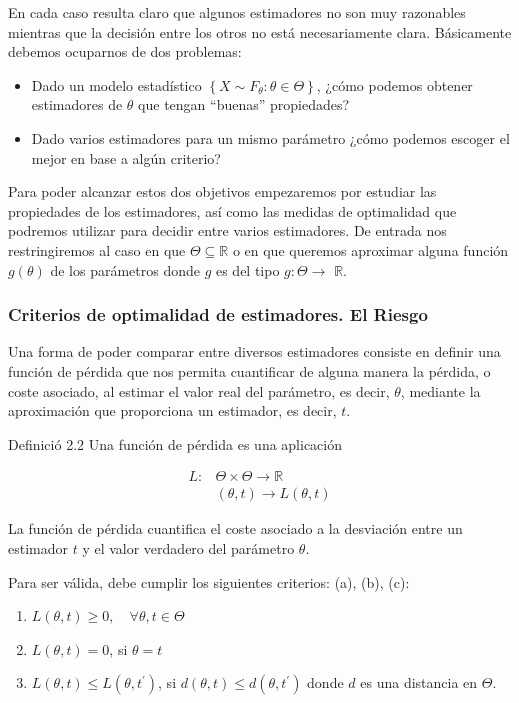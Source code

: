 \documentclass[
]{article}
\providecommand{\tightlist}{%
  \setlength{\itemsep}{0pt}\setlength{\parskip}{0pt}}
\begin{document}
En cada caso resulta claro que algunos estimadores no son muy razonables mientras que la decisión entre los otros no está necesariamente clara. Básicamente debemos ocuparnos de dos problemas:

\begin{itemize}
\tightlist
\item
  Dado un modelo estadístico \(\left\{X \sim F_{\theta}: \theta \in \Theta\right\}\), ¿cómo podemos obtener estimadores de \(\theta\) que tengan ``buenas'' propiedades?
\item
  Dado varios estimadores para un mismo parámetro ¿cómo podemos escoger el mejor en base a algún criterio?
\end{itemize}

Para poder alcanzar estos dos objetivos empezaremos por estudiar las propiedades de los estimadores, así como las medidas de optimalidad que podremos utilizar para decidir entre varios estimadores.
De entrada nos restringiremos al caso en que \(\Theta \subseteq \mathbb{R}\) o en que queremos aproximar alguna función \(g(\theta)\) de los parámetros donde \(g\) es del tipo \(g: \Theta \rightarrow\) \(\mathbb{R}\).

\subsubsection{Criterios de optimalidad de estimadores. El Riesgo}\label{criterios-de-optimalidad-de-estimadores.-el-riesgo}

Una forma de poder comparar entre diversos estimadores consiste en definir una función de pérdida que nos permita cuantificar de alguna manera la pérdida, o coste asociado, al estimar el valor real del parámetro, es decir, \(\theta\), mediante la aproximación que proporciona un estimador, es decir, \(t\).

Definició 2.2 Una función de pérdida es una aplicación

\[
\begin{aligned}
L: & \Theta \times \Theta \rightarrow \mathbb{R} \\
& (\theta, t) \rightarrow L(\theta, t)
\end{aligned}
\]

La función de pérdida cuantifica el coste asociado a la desviación entre un estimador \(t\) y el valor verdadero del parámetro \(\theta\).

Para ser válida, debe cumplir los siguientes criterios: (a), (b), (c):

\begin{enumerate}
\def\labelenumi{\alph{enumi})}
\tightlist
\item
  \(L(\theta, t) \geq 0, \quad \forall \theta, t \in \Theta\)
\item
  \(L(\theta, t)=0\), si \(\theta=t\)
\item
  \(L(\theta, t) \leq L\left(\theta, t^{\prime}\right)\), si \(d(\theta, t) \leq d\left(\theta, t^{\prime}\right)\) donde \(d\) es una distancia en \(\Theta\).
\end{enumerate}
\end{document}
